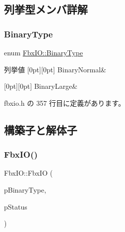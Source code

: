 \subsection{列挙型メンバ詳解}
\mbox{\label{class_fbx_i_o_ad0532f36367fa6b750993000dfb8ed1e}} 
\subsubsection{\texorpdfstring{Binary\+Type}{BinaryType}}
{\footnotesize\ttfamily enum \hyperlink{class_fbx_i_o_ad0532f36367fa6b750993000dfb8ed1e}{Fbx\+I\+O\+::\+Binary\+Type}}

\begin{DoxyEnumFields}{列挙値}
[0pt][0pt]{}\mbox{\label{class_fbx_i_o_ad0532f36367fa6b750993000dfb8ed1eaf6a4bfa7cf38e5cf98cc23f8ece8c7d3}} 
Binary\+Normal&\\
\hline

[0pt][0pt]{}\mbox{\label{class_fbx_i_o_ad0532f36367fa6b750993000dfb8ed1eadc2f299bd32d8da3c25f13d70125376f}} 
Binary\+Large&\\
\hline

\end{DoxyEnumFields}


 fbxio.\+h の 357 行目に定義があります。



\subsection{構築子と解体子}
\mbox{\label{class_fbx_i_o_a328bf0d723833d6bd3717c7865d9b5b0}} 
\subsubsection{\texorpdfstring{Fbx\+I\+O()}{FbxIO()}}
{\footnotesize\ttfamily Fbx\+I\+O\+::\+Fbx\+IO (\begin{DoxyParamCaption}\item[{\hyperlink{class_fbx_i_o_ad0532f36367fa6b750993000dfb8ed1e}{Binary\+Type}}]{p\+Binary\+Type,  }\item[{\hyperlink{class_fbx_status}{Fbx\+Status} \&}]{p\+Status }\end{DoxyParamCaption})}


